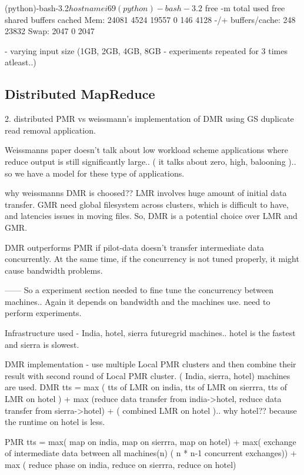 \documentclass{acm_proc_article-sp}
\begin{document}
(python)-bash-3.2$ hostname
i69
(python)-bash-3.2$ free -m
                  total          used       free     shared    buffers     cached
Mem:         24081       4524      19557          0        146       4128
-/+ buffers/cache:       248      23832
Swap:         2047          0       2047
	

         - varying input size (1GB, 2GB, 4GB, 8GB - experiments repeated for 3 times atleast..)

  



\subsection{Distributed MapReduce}

2. distributed PMR vs weissmann's implementation of  DMR using GS duplicate read removal application.

Weissmanns paper doesn't talk about low workload scheme applications where reduce output is still significantly large.. ( it talks about zero, high, balooning ).. so we have a model for these type of applications.

why weissmanns DMR is choosed?? LMR involves huge amount of initial data transfer. GMR need global filesystem across clusters, which is difficult to have, and latencies issues in moving files. So, DMR is a potential choice over LMR and GMR. 

DMR outperforms PMR if pilot-data doesn't transfer intermediate data concurrently. At the same time, if the concurrency  is not tuned properly, it might cause bandwidth problems.

------ So a experiment section needed to fine tune the concurrency between machines.. Again it depends on bandwidth and the machines use. need to perform experiments.

Infrastructure used - India, hotel, sierra futuregrid machines.. hotel is the fastest and sierra is slowest.

DMR implementation - use multiple Local PMR clusters and then combine their result with second round of Local PMR cluster. ( India, sierra, hotel) machines are used.
DMR tts = max ( tts of LMR on india, tts of LMR  on sierrra, tts of LMR  on hotel ) + max (reduce data transfer from india->hotel, reduce data transfer from sierra->hotel) + ( combined LMR on hotel ).. why hotel?? because the runtime on hotel is less.  

PMR tts = max( map  on india, map on  sierrra, map on hotel) + max( exchange of intermediate data between all machines(n) ( n * n-1 concurrent exchanges)) + max ( reduce phase on  india, reduce on  sierrra, reduce on hotel)
\end{document}
